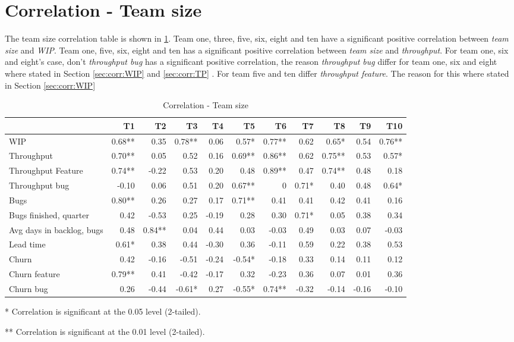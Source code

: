 \documentclass[UKenglish]{ifimaster}  %
\begin{document}
 
 \section{Correlation - Team size}
 The team size correlation table is shown in \ref{corr:Teams}. Team one, three, five, six, eight and ten have a significant positive correlation between \textit{team size} and  \textit{WIP}. Team one, five, six, eight and ten has a significant positive correlation between \textit{team size} and \textit{throughput}. For team one, six and eight's case, don't \textit{throughput bug} has a significant positive correlation, the reason \textit{throughput bug} differ for team one, six and eight where stated in Section \ref{sec:corr:WIP} and \ref{sec:corr:TP} . For team five and ten differ \textit{throughput feature}. The reason for this where stated in Section \ref{sec:corr:WIP}
 

 \begin{table}[!htbp]
  \begin{adjustwidth}{-1.5cm}{}
 \centering
 \begin{tabular}{|l|r|r|r|r|r|r|r|r|r|r|}
\hline
 & \bf{T1} & \bf{T2} & \bf{T3} & \bf{T4} & \bf{T5} & \bf{T6} & \bf{T7} & \bf{T8} & \bf{T9} & \bf{T10}\\ \hline
 WIP  & 0.68** & 0.35 & 0.78** & 0.06 & 0.57* & 0.77** & 0.62 & 0.65* & 0.54 & 0.76** \\ \hline
 Throughput  & 0.70** & 0.05 & 0.52 & 0.16 & 0.69** & 0.86** & 0.62 & 0.75** & 0.53 & 0.57* \\ \hline
 Throughput Feature  & 0.74** & -0.22 & 0.53 & 0.20 & 0.48 & 0.89** & 0.47 & 0.74** & 0.48 & 0.18 \\ \hline
 Throughput bug  & -0.10 & 0.06 & 0.51 & 0.20 & 0.67** & 0 &0.71* & 0.40 & 0.48 & 0.64* \\ \hline
 Bugs  & 0.80** & 0.26 & 0.27 & 0.17 & 0.71** & 0.41 & 0.41 & 0.42 & 0.41 & 0.16 \\ \hline
 Bugs finished, quarter  & 0.42 & -0.53 & 0.25 & -0.19 & 0.28 & 0.30 & 0.71* & 0.05 & 0.38 & 0.34 \\ \hline
 Avg days in backlog, bugs  & 0.48 & 0.84** & 0.04 & 0.44 & 0.03 & -0.03 & 0.49 & 0.03 & 0.07 & -0.03 \\ \hline
 Lead time  & 0.61* & 0.38 & 0.44 & -0.30 & 0.36 & -0.11 & 0.59 & 0.22 & 0.38 & 0.53 \\ \hline
 Churn  & 0.42 & -0.16 & -0.51 & -0.24 & -0.54* & -0.18 & 0.33 & 0.14 & 0.11 & 0.12 \\ \hline
 Churn feature  & 0.79** & 0.41 & -0.42 & -0.17 & 0.32 & -0.23 & 0.36 & 0.07 & 0.01 & 0.36 \\ \hline
 Churn bug  & 0.26 & -0.44 & -0.61* & 0.27 & -0.55* & 0.74** & -0.32 & -0.14 & -0.16 & -0.10 \\ \hline
\end{tabular}
 \caption{Correlation - Team size}
 \label{corr:Teams}
 \centerline {* Correlation is significant at the 0.05 level (2-tailed).}
\centerline{** Correlation is significant at the 0.01 level (2-tailed).}
\end{adjustwidth}
\end{table}
\end{document}
